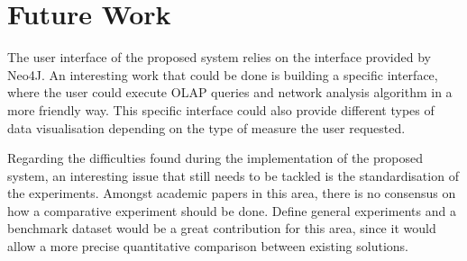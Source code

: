 \section{Future Work}
The user interface of the proposed system relies on the interface provided by Neo4J. An interesting work that could be done is building a specific interface, where the user could execute OLAP queries and network analysis algorithm in a more friendly way. This specific interface could also provide different types of data visualisation depending on the type of measure the user requested.

Regarding the difficulties found during the implementation of the proposed system, an interesting issue that still needs to be tackled is the standardisation of the experiments. Amongst academic papers in this area, there is no consensus on how a comparative experiment should be done. Define general experiments and a benchmark dataset  would be a great contribution for this area, since it would allow a more precise quantitative comparison between existing solutions.